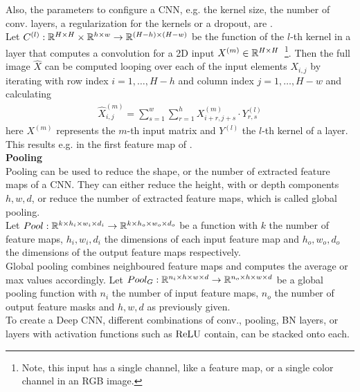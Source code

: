 Also, the parameters to configure a CNN, e.g. the kernel size, the number of conv. layers, a regularization for the kernels or a dropout, are .\\
Let $C^{(l)}: \mathbb{R}^{H\times H}\times \mathbb{R}^{h\times w} \rightarrow \mathbb{R}^{(H-h)\times (H-w)}$ be the function of the $l$-th kernel in a layer that computes a convolution for a 2D input $X^{(m)}\in\mathbb{R}^{H\times H}$~\footnote{
    Note, this input has a single channel, like a feature map, or a single color channel in an RGB image.
}.
Then the full image $\hat{X}$ can be computed looping over each of the input elements $X_{i,j}$ by iterating with row index $i=1,\ldots, H-h$ and column index $j=1,\ldots, H-w$ and calculating
\begin{align}
    \hat{X}_{i,j}^{(m)} =
    \sum\limits_{s=1}^w
    \sum\limits_{r=1}^h
    X^{(m)}_{i+r, j+s}\cdot Y^{(l)}_{r,s}
\end{align}
here $X^{(m)}$ represents the $m$-th input matrix and $Y^{(l)}$ the $l$-th kernel of a layer.
This results e.g. in the first feature map of .\\
\textbf{Pooling}\\
Pooling can be used to reduce the shape, or the number of extracted feature maps of a CNN.
They can either reduce the height, with or depth components $h, w, d$, or reduce the number of extracted feature maps, which is called global pooling.\\
Let $Pool: \mathbb{R}^{k\times h_i\times w_i\times d_i}\rightarrow \mathbb{R}^{k\times h_o\times w_o\times d_o}$
be a function with $k$ the number of feature maps, $h_i, w_i, d_i$ the dimensions of each input feature map and $h_o, w_o, d_o$ the dimensions of the output feature maps respectively.\\
Global pooling combines neighboured feature maps and computes the average or max values accordingly.\newline
Let $Pool_G: \mathbb{R}^{n_i\times h\times w\times d} \rightarrow \mathbb{R}^{n_o\times h\times w\times d}$ be a global pooling function with $n_i$ the number of input feature maps, $n_o$ the number of output feature masks and $h,w,d$ as previously given.\\
To create a Deep CNN, different combinations of conv., pooling, BN layers, or layers with activation functions such as $\operatorname{ReLU}$ contain, can be stacked onto each.

